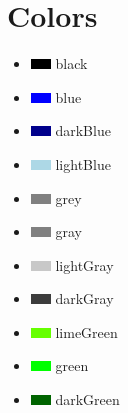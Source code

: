 \documentclass[10pt]{article}
\begin{document}
\section*{Colors}
\begin{itemize}
    \item \includegraphics{images/colors/black.png} black
    \item \includegraphics{images/colors/blue.png} blue
    \item \includegraphics{images/colors/darkBlue.png} darkBlue
    \item \includegraphics{images/colors/lightBlue.png} lightBlue
    \item \includegraphics{images/colors/grey.png} grey
    \item \includegraphics{images/colors/gray.png} gray
    \item \includegraphics{images/colors/lightGray.png} lightGray
    \item \includegraphics{images/colors/darkGray.png} darkGray
    \item \includegraphics{images/colors/limeGreen.png} limeGreen
    \item \includegraphics{images/colors/green.png} green
    \item \includegraphics{images/colors/darkGreen.png} darkGreen

\end{itemize}
\end{document}
